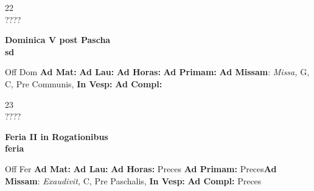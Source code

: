 \documentclass[10pt, openany]{book}
\begin{document}
    \begin{center}
        \begin{minipage}{3.5in}
            \vspace{2em}
            \begin{minipage}{0.5in}
                {\Huge 22} \\
                {\normalsize ????}
            \end{minipage}
            \begin{minipage}{3.0in}
                \textbf{ \large Dominica V post Pascha \\
                \textnormal{\normalsize sd}}

            \end{minipage}
            \begin{justify}Off Dom
                \textbf{Ad Mat: }
                \textbf{Ad Lau: }
                \textbf{Ad Horas: }
                \textbf{Ad Primam: }\textbf{Ad Missam}: \textit{Missa,} G, C, Pre Communis, 
                \textbf{In Vesp: }
                \textbf{Ad Compl: }
            \end{justify}
        \end{minipage}
    \end{center}

    \begin{center}
        \begin{minipage}{3.5in}
            \vspace{2em}
            \begin{minipage}{0.5in}
                {\Huge 23} \\
                {\normalsize ????}
            \end{minipage}
            \begin{minipage}{3.0in}
                \textbf{ \large Feria II in Rogationibus \\
                \textnormal{\normalsize feria}}

            \end{minipage}
            \begin{justify}Off Fer
                \textbf{Ad Mat: }
                \textbf{Ad Lau: }
                \textbf{Ad Horas: }Preces
                \textbf{Ad Primam: }Preces\textbf{Ad Missam}: \textit{Exaudivit,} C, Pre Paschalis, 
                \textbf{In Vesp: }
                \textbf{Ad Compl: }Preces
            \end{justify}
        \end{minipage}
    \end{center}
\end{document}
